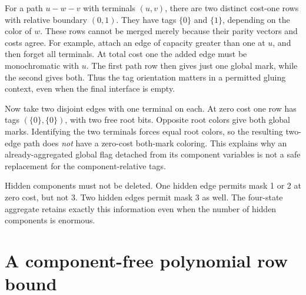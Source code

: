\documentclass[11pt,letterpaper]{article}
\theoremstyle{definition}
\theoremstyle{remark}\newtheorem{remark}[theorem]{Remark}
\begin{document}
For a path $u-w-v$ with terminals $(u,v)$, there are two distinct cost-one rows with relative boundary $(0,1)$. They have tags $\{0\}$ and $\{1\}$, depending on the color of $w$. These rows cannot be merged merely because their parity vectors and costs agree. For example, attach an edge of capacity greater than one at $u$, and then forget all terminals. At total cost one the added edge must be monochromatic with $u$. The first path row then gives just one global mark, while the second gives both. Thus the tag orientation matters in a permitted gluing context, even when the final interface is empty.

Now take two disjoint edges with one terminal on each. At zero cost one row has tags $(\{0\},\{0\})$, with two free root bits. Opposite root colors give both global marks. Identifying the two terminals forces equal root colors, so the resulting two-edge path does \emph{not} have a zero-cost both-mark coloring. This explains why an already-aggregated global flag detached from its component variables is not a safe replacement for the component-relative tags.

Hidden components must not be deleted. One hidden edge permits mask 1 or 2 at zero cost, but not 3. Two hidden edges permit mask 3 as well. The four-state aggregate retains exactly this information even when the number of hidden components is enormous.

\section{A component-free polynomial row bound}
\label{sec:counting}
\end{document}
